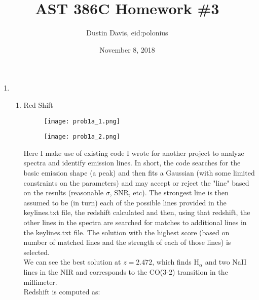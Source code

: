 \documentclass[11pt]{article}
\title{AST 386C Homework \#3}
\author{Dustin Davis, eid:polonius}
\date{November 8, 2018}
\begin{document}
\maketitle



\newpage 



\begin{enumerate}
\item  %
	
	\begin{enumerate}
	\item Red Shift\\
	
    \begin{figure}[H]
		\texttt{[image: prob1a\_1.png]}
		\caption{}
		\label{}
	\end{figure}
	
	\begin{figure}[H]
			\texttt{[image: prob1a\_2.png]}
			\caption{}
			\label{fig:gal_mm_spec}
	\end{figure}
	  
	Here I make use of existing code I wrote for another project to analyze spectra and identify emission lines. In short, the code searches for the basic emission shape (a peak) and then fits a Gaussian (with some limited constraints on the parameters) and may accept or reject the "line" based on the results (reasonable $\sigma$, SNR, etc). The strongest line is then assumed to be (in turn) each of the possible lines provided in the keylines.txt file, the redshift calculated and then, using that redshift, the other lines in the spectra are searched for matches to additional lines in the keylines.txt file. The solution with the highest score (based on number of matched lines and the strength of each of those lines) is selected.\\
	
	We can see the best solution at $z = 2.472$, which finds H$_{\alpha}$ and two NaII lines in the NIR and corresponds to the CO(3-2) transition in the millimeter.\\
	
	Redshift is computed as:\\
	

\end{enumerate}
\end{enumerate}
\end{document}
